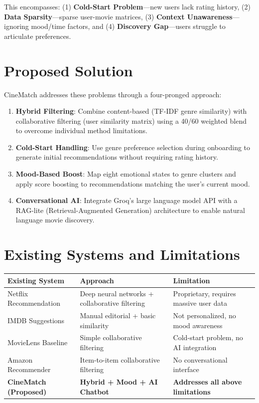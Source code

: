 \documentclass[12pt,a4paper]{report}
\begin{document}
This encompasses: (1) \textbf{Cold-Start Problem}---new users lack rating history, (2) \textbf{Data Sparsity}---sparse user-movie matrices, (3) \textbf{Context Unawareness}---ignoring mood/time factors, and (4) \textbf{Discovery Gap}---users struggle to articulate preferences.

\section{Proposed Solution}

CineMatch addresses these problems through a four-pronged approach:

\begin{enumerate}
    \item \textbf{Hybrid Filtering}: Combine content-based (TF-IDF genre similarity) with collaborative filtering (user similarity matrix) using a 40/60 weighted blend to overcome individual method limitations.
    \item \textbf{Cold-Start Handling}: Use genre preference selection during onboarding to generate initial recommendations without requiring rating history.
    \item \textbf{Mood-Based Boost}: Map eight emotional states to genre clusters and apply score boosting to recommendations matching the user's current mood.
    \item \textbf{Conversational AI}: Integrate Groq's large language model API with a RAG-lite (Retrieval-Augmented Generation) architecture to enable natural language movie discovery.
\end{enumerate}

\section{Existing Systems and Limitations}

\begin{longtable}{|p{3.5cm}|p{4cm}|p{5cm}|}
\hline
\textbf{Existing System} & \textbf{Approach} & \textbf{Limitation} \\
\hline
Netflix Recommendation & Deep neural networks + collaborative filtering & Proprietary, requires massive user data \\
\hline
IMDB Suggestions & Manual editorial + basic similarity & Not personalized, no mood awareness \\
\hline
MovieLens Baseline & Simple collaborative filtering & Cold-start problem, no AI integration \\
\hline
Amazon Recommender & Item-to-item collaborative filtering & No conversational interface \\
\hline
\textbf{CineMatch (Proposed)} & \textbf{Hybrid + Mood + AI Chatbot} & \textbf{Addresses all above limitations} \\
\hline
\end{longtable}
\end{document}
